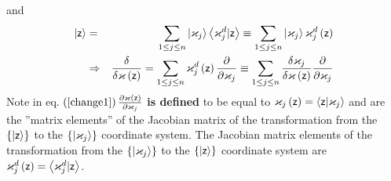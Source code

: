 and%
\begin{eqnarray}
\left| {\sf z}\right\rangle &=&\sum_{1\leq j\leq n}\left| {\bf \varkappa }%
_{j}\right\rangle \left\langle {\bf \varkappa }_{j}^{d}|{\sf z}\right\rangle
\equiv \sum_{1\leq j\leq n}\left| {\bf \varkappa }_{j}\right\rangle
\varkappa _{j}^{d}\left( {\sf z}\right)  \nonumber \\
&\Rightarrow &\frac{\delta }{\delta \varkappa \left( {\sf z}\right) }%
=\sum_{1\leq j\leq n}\varkappa _{j}^{d}\left( {\sf z}\right) \frac{\partial 
}{\partial \varkappa _{j}}\equiv \sum_{1\leq j\leq n}\frac{\delta \varkappa
_{j}}{\delta \varkappa \left( {\sf z}\right) }\frac{\partial }{\partial
\varkappa _{j}}  \label{change2}
\end{eqnarray}%
Note in eq. $\left( \ref{change1}\right) \frac{\partial \varkappa \left( 
{\sf z}\right) }{\partial \varkappa _{j}}$ {\bf is defined }to be equal to $%
\varkappa _{j}\left( {\sf z}\right) =\left\langle {\sf z}|{\bf \varkappa }%
_{j}\right\rangle $ and are the ''matrix elements'' of the Jacobian matrix
of the transformation from the $\left\{ \left| {\sf z}\right\rangle \right\} 
$ to the $\left\{ \left| {\bf \varkappa }_{j}\right\rangle \right\} $
coordinate system. The Jacobian matrix elements of the transformation from
the $\left\{ \left| {\bf \varkappa }_{j}\right\rangle \right\} $ to the $%
\left\{ \left| {\sf z}\right\rangle \right\} $ coordinate system are $%
\varkappa _{j}^{d}\left( {\sf z}\right) =\left\langle {\bf \varkappa }%
_{j}^{d}|{\sf z}\right\rangle $.

